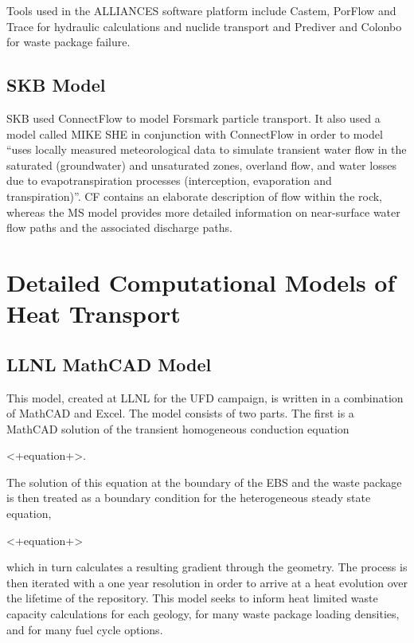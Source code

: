 Tools used in the ALLIANCES software platform include Castem, PorFlow and Trace
for hydraulic calculations and nuclide transport and Prediver and Colonbo for
waste package failure.

\subsection{SKB Model} SKB used ConnectFlow to model Forsmark particle
transport. It also used a model called MIKE SHE in conjunction with ConnectFlow
in order to model ``uses locally measured meteorological data to simulate
transient water flow in the saturated (groundwater) and unsaturated zones,
overland flow, and water losses due to evapotranspiration processes
(interception, evaporation and transpiration)''. CF contains an elaborate
description of flow within the rock, whereas the MS model provides more
detailed information on near-surface water flow paths and the associated
discharge paths.



\section{Detailed Computational Models of Heat Transport}
\label{sec:detailed_heat}



\subsection{LLNL MathCAD Model}

This model, created at \gls{LLNL} for the \gls{UFD} campaign, is written in a 
combination of MathCAD and Excel. The model consists of two parts. The first is 
a MathCAD solution of the transient homogeneous conduction equation

<+equation+>. 

The 
solution of this equation at the boundary of the EBS and the waste package is 
then treated as a boundary condition for the heterogeneous steady state 
equation, 

<+equation+>

which in turn calculates a resulting gradient through the geometry. The 
process is then iterated with a one year resolution in order to arrive at a heat 
evolution over  the lifetime of the repository. This model seeks to inform heat
limited waste capacity calculations for each geology, for many waste package 
loading densities, and for many fuel cycle options.  


